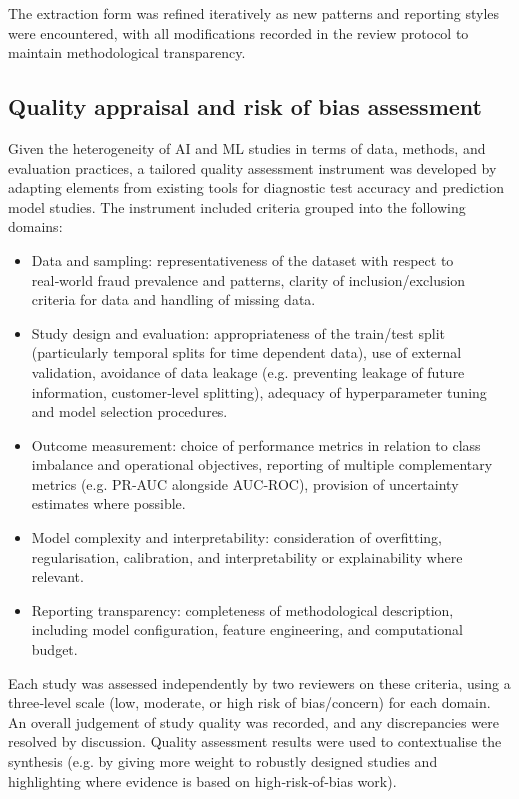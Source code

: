 \documentclass[a4paper,fleqn]{cas-dc}
\begin{document}
The extraction form was refined iteratively as new patterns and reporting styles were encountered, with all modifications recorded in the review protocol to maintain methodological transparency.

\subsection{Quality appraisal and risk of bias assessment}
Given the heterogeneity of AI and ML studies in terms of data, methods, and evaluation practices, a tailored quality assessment instrument was developed by adapting elements from existing tools for diagnostic test accuracy and prediction model studies. 
The instrument included criteria grouped into the following domains:
\begin{itemize}
\item Data and sampling: representativeness of the dataset with respect to real‑world fraud prevalence and patterns, clarity of inclusion/exclusion criteria for data and handling of missing data.

\item Study design and evaluation: appropriateness of the train/test split (particularly temporal splits for time dependent data), use of external validation, avoidance of data leakage (e.g. preventing leakage of future information, customer‑level splitting), adequacy of hyperparameter tuning and model selection procedures.

\item Outcome measurement: choice of performance metrics in relation to class imbalance and operational objectives, reporting of multiple complementary metrics (e.g. PR‑AUC alongside AUC‑ROC), provision of uncertainty estimates where possible.

\item Model complexity and interpretability: consideration of overfitting, regularisation, calibration, and interpretability or explainability where relevant.

\item Reporting transparency: completeness of methodological description, including model configuration, feature engineering, and computational budget.
 \end{itemize}
Each study was assessed independently by two reviewers on these criteria, using a three‑level scale (low, moderate, or high risk of bias/concern) for each domain. 
An overall judgement of study quality was recorded, and any discrepancies were resolved by discussion. Quality assessment results were used to contextualise the synthesis (e.g. by giving more weight to robustly designed studies and highlighting where evidence is based on high‑risk‑of‑bias work).
\end{document}
